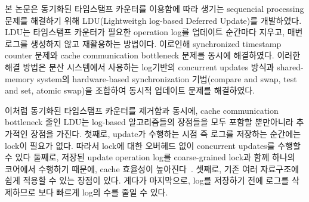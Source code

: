 %
\ifkor
본 논문은 동기화된 타임스탬프 카운터를 이용함에 따라 생기는 sequencial processing 문제를
해결하기 위해 LDU(Lightweitgh log-based Deferred Update)를 개발하였다. 
LDU는 타임스탬프 카운터가 필요한 operation log를 업데이트 순간마다 지우고, 매번 로그를 생성하지 않고 재활용하는 방법이다.
이로인해 synchronized timestamp counter 문제와 cache communication bottleneck 문제를 동시에
해결하였다.
이러한 해결 방법은 분산 시스템에서 사용하는 log기반의 concurrent updates 방식과 shared-memory system의 
hardware-based synchronization 기법(compare and swap, test and
set, atomic swap)을 조합하여 동시적 업데이트 문제를 해결하였다.
\else
\fi

\ifkor
이처럼 동기화된 타임스탬프 카운터를 제거함과 동시에, cache communication bottleneck 줄인
LDU는 log-based 알고리즘들의 장점들을 모두 포함할 뿐만아니라 추가적인 장점을 가진다.
첫째로, update가 수행하는 시점 즉 로그를 저장하는 순간에는 lock이 필요가 없다. 
따라서 lock에 대한 오버헤드 없이 concurrent updates를 수행할 수 있다
둘째로, 저장된 update operation log를 coarse-grained lock과 함께 하나의 코어에서 수행하기 때문에,
cache 효율성이 높아진다~\cite{Hendler2010FC}.
셋째로, 기존 여러 자료구조에 쉽게 적용할 수 있는 장점이 있다.
게다가 마지막으로, log를 저장하기 전에 로그를 삭제하므로 보다 빠르게 log의 수를 줄일 수 있다. 
\else
\fi

